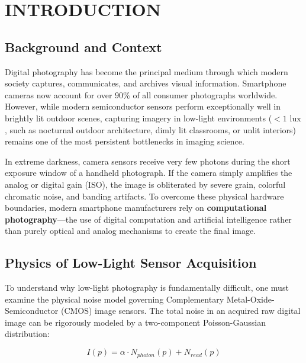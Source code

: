 \chapter{INTRODUCTION}

\section{Background and Context}
Digital photography has become the principal medium through which modern society captures, communicates, and archives visual information. Smartphone cameras now account for over $90\%$ of all consumer photographs worldwide. However, while modern semiconductor sensors perform exceptionally well in brightly lit outdoor scenes, capturing imagery in low-light environments ($< 1\text{ lux}$, such as nocturnal outdoor architecture, dimly lit classrooms, or unlit interiors) remains one of the most persistent bottlenecks in imaging science.

In extreme darkness, camera sensors receive very few photons during the short exposure window of a handheld photograph. If the camera simply amplifies the analog or digital gain (ISO), the image is obliterated by severe grain, colorful chromatic noise, and banding artifacts. To overcome these physical hardware boundaries, modern smartphone manufacturers rely on \textbf{computational photography}---the use of digital computation and artificial intelligence rather than purely optical and analog mechanisms to create the final image.

\section{Physics of Low-Light Sensor Acquisition}
To understand why low-light photography is fundamentally difficult, one must examine the physical noise model governing Complementary Metal-Oxide-Semiconductor (CMOS) image sensors. The total noise in an acquired raw digital image can be rigorously modeled by a two-component Poisson-Gaussian distribution:

\begin{equation}
I(p) = \alpha \cdot N_{photon}(p) + N_{read}(p)
\label{eq:noise_model}
\end{equation}

